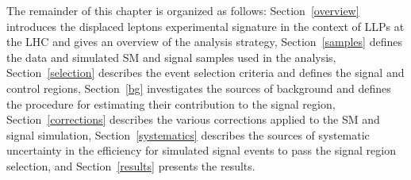 The remainder of this chapter is organized as follows: Section~\ref{overview} introduces the displaced leptons experimental signature in the context of LLPs at the LHC and gives an overview of the analysis strategy, Section~\ref{samples} defines the data and simulated SM and signal samples used in the analysis, Section~\ref{selection} describes the event selection criteria and defines the signal and control regions, Section~\ref{bg} investigates the sources of background and defines the procedure for estimating their contribution to the signal region, Section~\ref{corrections} describes the various corrections applied to the SM and signal simulation, Section~\ref{systematics} describes the sources of systematic uncertainty in the efficiency for simulated signal events to pass the signal region selection, and Section~\ref{results} presents the results.






